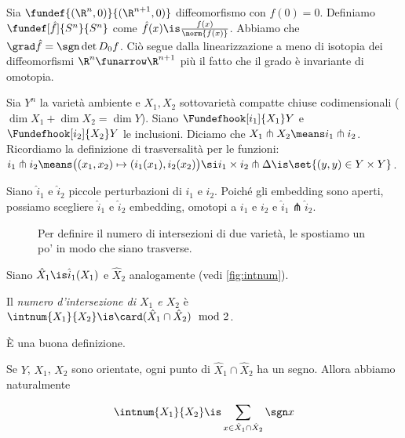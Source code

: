
Sia $\fundef{(\R^n,0)}{(\R^{n+1},0)}$ diffeomorfismo con $f(0)=0$.
Definiamo $\fundef[\hat f]{S^n}{S^n}$ come $\hat f(x)\is\frac{f(x)}{\norm{f(x)}}$.
Abbiamo che $\grad\hat f=\sgn\det D_0f$.
Ciò segue dalla linearizzazione a meno di isotopia dei diffeomorfismi $\R^n\funarrow\R^{n+1}$ più il fatto che il grado è invariante di omotopia.


Sia $Y^n$ la varietà ambiente e $X_1,X_2$ sottovarietà compatte chiuse codimensionali ($\dim X_1+\dim X_2=\dim Y$).
Siano $\Fundefhook[i_1]{X_1}Y$ e $\Fundefhook[i_2]{X_2}Y$ le inclusioni.
Diciamo che $X_1 \pitchfork X_2\means i_1\pitchfork i_2$.
Ricordiamo la definizione di trasversalità per le funzioni: $i_1 \pitchfork i_2 \means\big((x_1,x_2)\mapsto(i_1(x_1),i_2(x_2)\big)\si i_1\times i_2\pitchfork\Delta\is\set{(y,y)\in Y\times Y}$.

Siano $\hat i_1$ e $\hat i_2$ piccole perturbazioni di $i_1$ e $i_2$.
Poiché gli embedding sono aperti, possiamo scegliere $\hat i_1$ e $\hat i_2$ embedding, omotopi a $i_1$ e $i_2$ e $\hat i_1\pitchfork\hat i_2$.
\begin{figure}
	\centering
	
	\caption{Per definire il numero di intersezioni di due varietà, le spostiamo un po' in modo che siano trasverse.}
	\label{fig:intnum}
\end{figure}
Siano $\hat X_1\is\hat i_1(X_1)$ e $\hat X_2$ analogamente (vedi \autoref{fig:intnum}).

\begin{defn}
	Il \emph{numero d'intersezione di $X_1$ e $X_2$} è $\intnum{X_1}{X_2}\is\card(\hat X_1\cap\hat X_2)\mod 2$.
\end{defn}

\begin{teo}
	È una buona definizione.
\end{teo}


Se $Y$, $X_1$, $X_2$ sono orientate, ogni punto di $\hat X_1\cap\hat X_2$ ha un segno.\footnotemark
Allora abbiamo naturalmente

\begin{defn}
	\[\intnum{X_1}{X_2}\is\sum_{x\in\hat X_1\cap\hat X_2}\sgn x\]
\end{defn}

